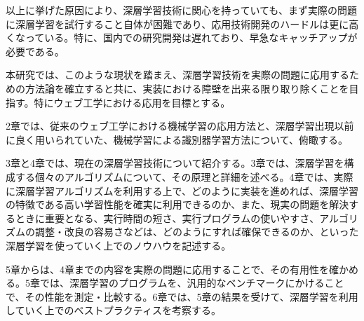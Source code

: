 以上に挙げた原因により、深層学習技術に関心を持っていても、まず実際の問題に深層学習を試行すること自体が困難であり、応用技術開発のハードルは更に高くなっている。特に、国内での研究開発は遅れており、早急なキャッチアップが必要である。\par
本研究では、このような現状を踏まえ、深層学習技術を実際の問題に応用するための方法論を確立すると共に、実装における障壁を出来る限り取り除くことを目指す。特にウェブ工学における応用を目標とする。\par
2章では、従来のウェブ工学における機械学習の応用方法と、深層学習出現以前に良く用いられていた、機械学習による識別器学習方法について、俯瞰する。
\par3章と4章では、現在の深層学習技術について紹介する。3章では、深層学習を構成する個々のアルゴリズムについて、その原理と詳細を述べる。4章では、実際に深層学習アルゴリズムを利用する上で、どのように実装を進めれば、深層学習の特徴である高い学習性能を確実に利用できるのか、また、現実の問題を解決するときに重要となる、実行時間の短さ、実行プログラムの使いやすさ、アルゴリズムの調整・改良の容易さなどは、どのようにすれば確保できるのか、といった深層学習を使っていく上でのノウハウを記述する。\par
5章からは、4章までの内容を実際の問題に応用することで、その有用性を確かめる。5章では、深層学習のプログラムを、汎用的なベンチマークにかけることで、その性能を測定・比較する。6章では、5章の結果を受けて、深層学習を利用していく上でのベストプラクティスを考察する。
